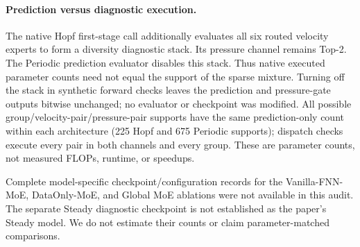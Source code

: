 \paragraph{Prediction versus diagnostic execution.}
The native Hopf first-stage call additionally evaluates all six routed velocity
experts to form a diversity diagnostic stack. Its pressure channel remains
Top-2. The Periodic prediction evaluator disables this stack. Thus native
executed parameter counts need not equal the support of the sparse mixture.
Turning off the stack in synthetic forward checks leaves the prediction and
pressure-gate outputs bitwise unchanged; no evaluator or checkpoint was modified.
All possible group/velocity-pair/pressure-pair supports have the same
prediction-only count within each architecture (225 Hopf and 675 Periodic
supports); dispatch checks execute every pair in both channels and every group.
These are parameter counts, not measured FLOPs, runtime, or speedups.

Complete model-specific checkpoint/configuration records for the Vanilla-FNN-MoE,
DataOnly-MoE, and Global MoE ablations were not available in this audit. The
separate Steady diagnostic checkpoint is not established as the paper's Steady
model. We do not estimate their counts or claim parameter-matched comparisons.
